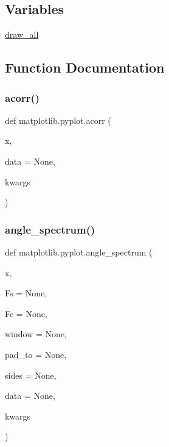 \subsection*{Variables}
\begin{DoxyCompactItemize}
\item 
\hyperlink{namespacematplotlib_1_1pyplot_a47efc37d5fd923c975e622168d50c6c1}{draw\+\_\+all}
\end{DoxyCompactItemize}


\subsection{Function Documentation}
\mbox{\label{namespacematplotlib_1_1pyplot_ae79eb543dcc7c85935642a758ecfec4a}} 
\subsubsection{\texorpdfstring{acorr()}{acorr()}}
{\footnotesize\ttfamily def matplotlib.\+pyplot.\+acorr (\begin{DoxyParamCaption}\item[{}]{x,  }\item[{}]{data = {\ttfamily None},  }\item[{}]{kwargs }\end{DoxyParamCaption})}

\mbox{\label{namespacematplotlib_1_1pyplot_ad8a8bef6e5dd83840e72cb8f6df43104}} 
\subsubsection{\texorpdfstring{angle\+\_\+spectrum()}{angle\_spectrum()}}
{\footnotesize\ttfamily def matplotlib.\+pyplot.\+angle\+\_\+spectrum (\begin{DoxyParamCaption}\item[{}]{x,  }\item[{}]{Fs = {\ttfamily None},  }\item[{}]{Fc = {\ttfamily None},  }\item[{}]{window = {\ttfamily None},  }\item[{}]{pad\+\_\+to = {\ttfamily None},  }\item[{}]{sides = {\ttfamily None},  }\item[{}]{data = {\ttfamily None},  }\item[{}]{kwargs }\end{DoxyParamCaption})}

